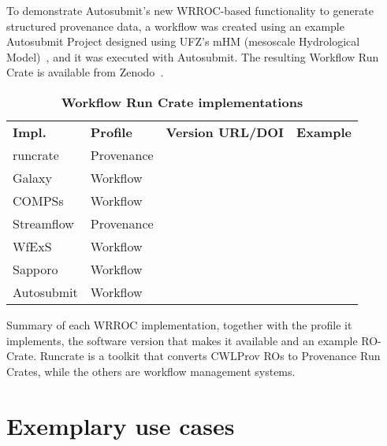 To demonstrate Autosubmit's new WRROC-based functionality to generate structured provenance data, a workflow was created using an example Autosubmit Project designed using UFZ's mHM (mesoscale Hydrological Model)~\cite{Samaniego 2010,Kumar 2013}, and it was executed with Autosubmit. The resulting Workflow Run Crate is available from Zenodo~\cite{Kinoshita 2023}.

\begin{table}[htb]
  \centering
  \caption{
  {\bf Workflow Run Crate implementations}}
  \begin{tabular}{l|l|l|l}
  \hline
  {\bf Impl.} & {\bf Profile} & {\bf Version URL/DOI} &
  {\bf Example}\\
  runcrate & Provenance & \footnotesize \cite{runcrate}  & \footnotesize \cite{run-pathology} \\
  Galaxy & Workflow & \footnotesize \cite{Galaxy 2023} & \footnotesize \cite{De Geest 2023} \\
  COMPSs & Workflow & \footnotesize \cite{Ejarque 2023} & \footnotesize \cite{Poiata 2023} \\
  Streamflow & Provenance & \footnotesize \cite{Colonnelli 2023b} & \footnotesize \cite{Colonnelli 2023} \\
  WfExS & Workflow & \footnotesize \cite{Fernandez 2024a} & \footnotesize \cite{Fernandez 2024b} \\
  Sapporo & Workflow & \footnotesize \cite{Suetake 2023b} & \footnotesize \cite{Ohta 2023} \\
  Autosubmit & Workflow & \footnotesize \cite{Beltran 2023} & \footnotesize \cite{Kinoshita 2023} \\
  \end{tabular}
  \begin{flushleft} 
    Summary of each WRROC implementation, together with the profile it implements, the software version that makes it available and an example RO-Crate. Runcrate is a toolkit that converts CWLProv ROs to Provenance Run Crates, while the others are workflow management systems.
  \end{flushleft}
  \label{wrroc:implementation_summary_table}
\end{table}


\section{Exemplary use cases}\label{wrroc:exemplary-use-cases}

